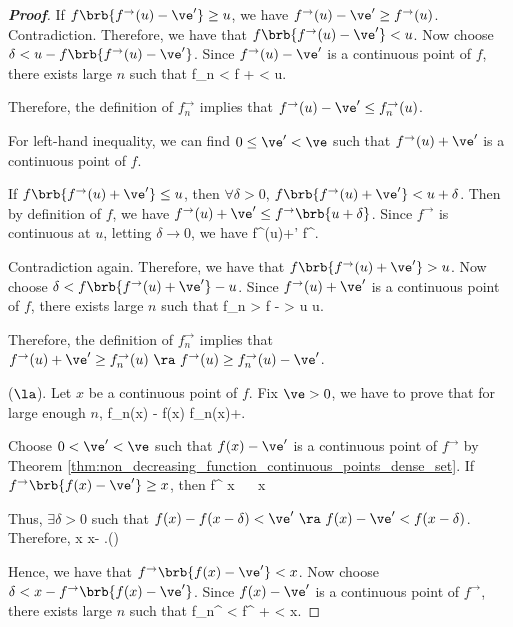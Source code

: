 \begin{proof}[\bf Proof]
If $f\brb{f^{\to }(u)-\ve'} \geq u$, we have $f^{\to}(u)-\ve' \geq f^{\to}(u)$. Contradiction. Therefore, we have that $f\brb{f^{\to}(u)-\ve'} < u$. Now choose $\delta < u - f\brb{f^{\to}(u)-\ve'}$. Since $f^{\to}(u)-\ve'$ is a continuous point of $f$, there exists large $n$ such that
\be
f_n < f + \delta < u.
\ee

Therefore, the definition of $f_n^{\to}$ implies that $f^{\to}(u)-\ve' \leq f_n^{\to}(u)$.


For left-hand inequality, we can find $0\leq \ve'< \ve$ such that $f^{\to}(u)+\ve'$ is a continuous point of $f$.

If $f\brb{f^{\to }(u)+\ve'} \leq u$, then $\forall \delta >0$, $f\brb{f^{\to }(u)+\ve'} < u + \delta$. Then by definition of $f$, we have $f^{\to }(u)+\ve' \leq f^{\to}\brb{u + \delta}$. Since $f^{\to}$ is continuous at $u$, letting $\delta \to 0$, we have
\be
f^{\to }(u)+\ve' \leq f^{\to}.
\ee

Contradiction again. Therefore, we have that $f\brb{f^{\to}(u)+\ve'} > u$. Now choose $\delta < f\brb{f^{\to}(u)+\ve'}-u$. Since $f^{\to}(u)+\ve'$ is a continuous point of $f$, there exists large $n$ such that
\be
f_n > f - \delta > u \geq u.
\ee

Therefore, the definition of $f_n^{\to}$ implies that $f^{\to}(u)+\ve' \geq f_n^{\to}(u) \ \ra\ f^{\to}(u) \geq f_n^{\to}(u) - \ve'$.


($\la$). Let $x$ be a continuous point of $f$. Fix $\ve >0$, we have to prove that for large enough $n$,
\be
f_n(x) - \ve \leq f(x) \leq f_n(x)+\ve.
\ee

Choose $0<\ve'<\ve$ such that $f(x)-\ve'$ is a continuous point of $f^{\to}$ by Theorem \ref{thm:non_decreasing_function_continuous_points_dense_set}. If $f^{\to}\brb{f(x)-\ve'} \geq x$, then
\be
f^{\to} \geq x \ \ra\ \inf{} \geq x
\ee

Thus, $\exists \delta >0$ such that $f(x) - f(x-\delta)< \ve' \ \ra \ f(x)-\ve' < f(x-\delta)$. Therefore,
\be
x\leq \inf{} \leq x- \delta.\qquad ()
\ee

Hence, we have that $f^{\to}\brb{f(x)-\ve'} < x$. Now choose $\delta < x - f^{\to}\brb{f(x)-\ve'}$. Since $f(x)-\ve'$ is a continuous point of $f^{\to}$, there exists large $n$ such that
\be
f_n^{\to} < f^{\to} + \delta < x.
\ee


\end{proof}
